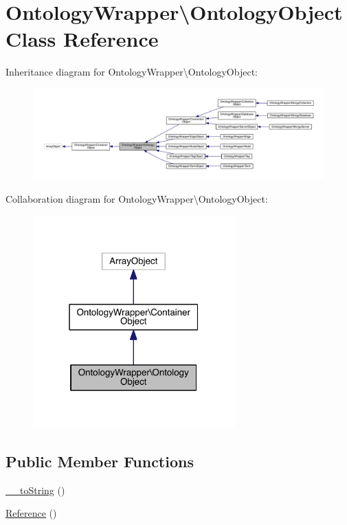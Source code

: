 \hypertarget{class_ontology_wrapper_1_1_ontology_object}{\section{Ontology\-Wrapper\textbackslash{}Ontology\-Object Class Reference}
\label{class_ontology_wrapper_1_1_ontology_object}
}


Inheritance diagram for Ontology\-Wrapper\textbackslash{}Ontology\-Object\-:
\nopagebreak
\begin{figure}[H]
\begin{center}
\leavevmode
\includegraphics[width=350pt]{class_ontology_wrapper_1_1_ontology_object__inherit__graph}
\end{center}
\end{figure}


Collaboration diagram for Ontology\-Wrapper\textbackslash{}Ontology\-Object\-:
\nopagebreak
\begin{figure}[H]
\begin{center}
\leavevmode
\includegraphics[width=220pt]{class_ontology_wrapper_1_1_ontology_object__coll__graph}
\end{center}
\end{figure}
\subsection*{Public Member Functions}
\begin{DoxyCompactItemize}
\item 
\hyperlink{class_ontology_wrapper_1_1_ontology_object_aa3f8d87842ea2c3a50b3e760adb2224f}{\-\_\-\-\_\-to\-String} ()
\item 
\hyperlink{class_ontology_wrapper_1_1_ontology_object_a28e1502b1cc43e05c07d854e79780e9c}{Reference} ()
\end{DoxyCompactItemize}
